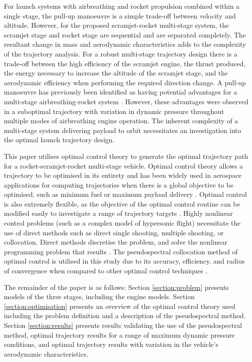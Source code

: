 \documentclass[]{aiaa-tc}
\begin{document}
 For launch systems with airbreathing and rocket propulsion combined within a single stage, the pull-up manoeuvre is a simple trade-off between velocity and altitude. However, for the proposed scramjet-rocket multi-stage system, the scramjet stage and rocket stage are sequential and are separated completely.
 The resultant change in mass and aerodynamic characteristics adds to the complexity of the trajectory analysis.
 For a robust multi-stage trajectory design there is a trade-off between the high efficiency of the scramjet engine, the thrust produced, the energy necessary to increase the altitude of the scramjet stage, and the aerodynamic efficiency when performing the required direction change. A pull-up manoeuvre has previously been identified as having potential advantages for a multi-stage airbreathing-rocket system \cite{Mehta2001}. However, these advantages were observed in a suboptimal trajectory with variation in dynamic pressure throughout multiple modes of airbreathing engine operation. The inherent complexity of a multi-stage system delivering payload to orbit necessitates an investigation into the optimal launch trajectory design.


This paper utilises optimal control theory to generate the optimal trajectory path for a rocket-scramjet-rocket multi-stage vehicle.
Optimal control theory allows a trajectory to be optimised in its entirety and has been widely used in aerospace applications for computing trajectories when there is a global objective to be optimised, such as minimum fuel or maximum payload delivery \cite{Bedrossian,Josselyn2002,Sekhavat2005}. Optimal control is also extremely flexible, as the objective of the optimal control routine can be modified easily to investigate a range of trajectory targets \cite{Ranieri2005}. Highly nonlinear control problems (such as a complex model of hypersonic flight) necessitate the use of direct methods such as direct single shooting, multiple shooting, or collocation. Direct methods discretise the problem, and solve the nonlinear programming problem that results \cite{Fahroo2000}. The pseudospectral collocation method of optimal control is utilised in this study due to its accuracy, efficiency, and radius of convergence when compared to other optimal control techniques \cite{Fahroo2000,Elganar}.

The remainder of the paper is as follows: Section \ref{section:problem} presents models of the three stages, including the engine models. Section \ref{section:optimisation} presents an overview of the optimal control theory used including the problem definition and a description of the pseudospectral method. Section \ref{section:results} presents results validating the use of the pseudospectral method, optimal trajectory results for a range of maximum dynamic pressure conditions, and optimal trajectory results with variation in the vehicle's aerodynamic characteristics.
\end{document}

